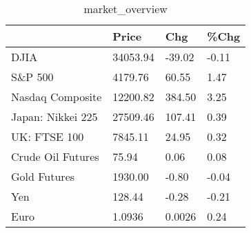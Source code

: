 \documentclass{article}%
\begin{document}
%


\begin{table}[htbp]%
\caption{market\_overview}%
\centering%
\begin{adjustbox}{width=1\textwidth}%
\begin{tabular}{llll}
\toprule
                  &    Price &    Chg &  \%Chg \\
\midrule
             DJIA & 34053.94 & -39.02 & -0.11 \\
          S\&P 500 &  4179.76 &  60.55 &  1.47 \\
 Nasdaq Composite & 12200.82 & 384.50 &  3.25 \\
Japan: Nikkei 225 & 27509.46 & 107.41 &  0.39 \\
     UK: FTSE 100 &  7845.11 &  24.95 &  0.32 \\
Crude Oil Futures &    75.94 &   0.06 &  0.08 \\
     Gold Futures &  1930.00 &  -0.80 & -0.04 \\
              Yen &   128.44 &  -0.28 & -0.21 \\
             Euro &   1.0936 & 0.0026 &  0.24 \\
\bottomrule
\end{tabular}
%
\end{adjustbox}%
\end{table}

%
\end{document}
